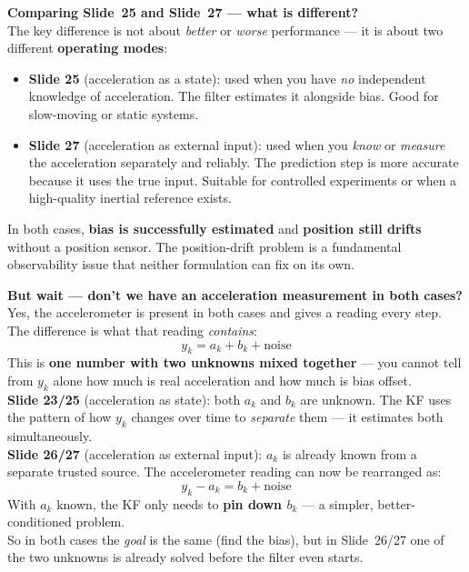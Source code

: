 \documentclass[12pt, a4paper]{article}
\begin{document}
\begin{notebox}
  \textbf{Comparing Slide~25 and Slide~27 --- what is different?}\\
  The key difference is not about \emph{better} or \emph{worse}
  performance --- it is about two different \textbf{operating modes}:
  \begin{itemize}[leftmargin=1.4em, topsep=2pt]
    \item \textbf{Slide 25} (acceleration as a state):
          used when you have \emph{no} independent knowledge of
          acceleration.
          The filter estimates it alongside bias.
          Good for slow-moving or static systems.
    \item \textbf{Slide 27} (acceleration as external input):
          used when you \emph{know} or \emph{measure} the acceleration
          separately and reliably.
          The prediction step is more accurate because it uses the
          true input.
          Suitable for controlled experiments or when a high-quality
          inertial reference exists.
  \end{itemize}
  In both cases, \textbf{bias is successfully estimated} and
  \textbf{position still drifts} without a position sensor.
  The position-drift problem is a fundamental observability issue
  that neither formulation can fix on its own.
\end{notebox}

\begin{notebox}
  \textbf{But wait --- don't we have an acceleration measurement in
  both cases?}\\
  Yes, the accelerometer is present in both cases and gives a reading
  every step.
  The difference is what that reading \emph{contains}:
  \[
    y_k = a_k + b_k + \text{noise}
  \]
  This is \textbf{one number with two unknowns mixed together} ---
  you cannot tell from $y_k$ alone how much is real acceleration and
  how much is bias offset.\\[4pt]
  \textbf{Slide 23/25} (acceleration as state): both $a_k$ and $b_k$
  are unknown.
  The KF uses the pattern of how $y_k$ changes over time to
  \emph{separate} them --- it estimates both simultaneously.\\[4pt]
  \textbf{Slide 26/27} (acceleration as external input): $a_k$ is
  already known from a separate trusted source.
  The accelerometer reading can now be rearranged as:
  \[
    y_k - a_k = b_k + \text{noise}
  \]
  With $a_k$ known, the KF only needs to \textbf{pin down $b_k$} ---
  a simpler, better-conditioned problem.\\[4pt]
  So in both cases the \emph{goal} is the same (find the bias), but in
  Slide~26/27 one of the two unknowns is already solved before the
  filter even starts.
\end{notebox}
\end{document}
